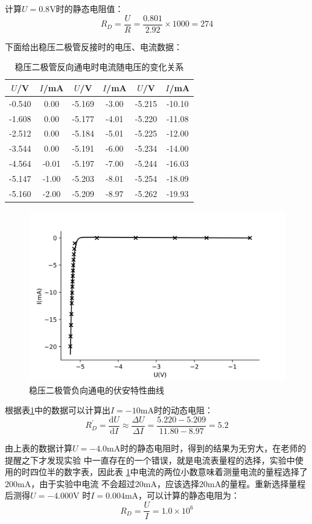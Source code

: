 \documentclass[a4paper]{ctexart}
\begin{document}
		\par 
		计算$U=0.8$V时的静态电阻值：
		$$
		R_D = \frac{U}{R} = \frac{0.801}{2.92} \times 1000 = 274
		$$
		\par 
		下面给出稳压二极管反接时的电压、电流数据：
		\begin{table}[htbp]
			\centering
			\caption{稳压二极管反向通电时电流随电压的变化关系}
			\label{diode_relation-}
			\begin{tabular}{cc|cc|cc}
				\toprule
				$U$/V & $I$/mA & $U$/V & $I$/mA & $U$/V & $I$/mA\\
				\midrule
				-0.540 &  0.00 & -5.169 & -3.00 & -5.215 & -10.10 \\
				-1.608 &  0.00 & -5.177 & -4.01 & -5.220 & -11.08 \\
				-2.512 &  0.00 & -5.184 & -5.01 & -5.225 & -12.00 \\
				-3.544 &  0.00 & -5.191 & -6.00 & -5.234 & -14.00 \\
				-4.564 & -0.01 & -5.197 & -7.00 & -5.244 & -16.03 \\
				-5.147 & -1.00 & -5.203 & -8.01 & -5.254 & -18.09 \\
				-5.160 & -2.00 & -5.209 & -8.97 & -5.262 & -19.93 \\
				\bottomrule
			\end{tabular}
		\end{table}
		\begin{figure}[htbp]
			\centering
			\includegraphics[scale=0.65]{diode_curve-}
			\caption{稳压二极管负向通电的伏安特性曲线}
			\label{diode_curve-}
		\end{figure}
		\par 
		根据表\ref{diode_relation-}中的数据可以计算出$I=-10$mA时的动态电阻：
		$$
		R_{D}^{'} = \frac{\mathrm{d}U}{\mathrm{d}I} \approx \frac{\Delta U}{\Delta I} = \frac{5.220-5.209}{11.80-8.97}=5.2
		$$
		\par 
		由上表的数据计算$U=-4.0\mathrm{mA}$时的静态电阻时，得到的结果为无穷大，在老师的提醒之下才发现实验
		中一直存在的一个错误，就是电流表量程的选择，实验中使用的时四位半的数字表，因此表
		\ref{diode_relation-}中电流的两位小数意味着测量电流的量程选择了$200\mathrm{mA}$，由于实验中电流
		不会超过$20\mathrm{mA}$，应该选择$20\mathrm{mA}$的量程。重新选择量程后测得$U=-4.000\mathrm{V}$
		时$I=0.004\mathrm{mA}$，可以计算的静态电阻为：
		$$
		R_D = \frac{U}{I} = 1.0\times 10^{6}
		$$
\end{document}
